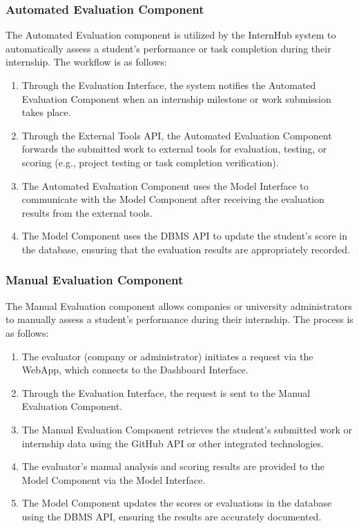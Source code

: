 \subsubsection{Automated Evaluation Component}
The Automated Evaluation component is utilized by the InternHub system to automatically assess a student’s performance or task completion during their internship. The workflow is as follows:
\begin{enumerate}
    \item Through the Evaluation Interface, the system notifies the Automated Evaluation Component when an internship milestone or work submission takes place.
    \item Through the External Tools API, the Automated Evaluation Component forwards the submitted work to external tools for evaluation, testing, or scoring (e.g., project testing or task completion verification).
    \item The Automated Evaluation Component uses the Model Interface to communicate with the Model Component after receiving the evaluation results from the external tools.
    \item The Model Component uses the DBMS API to update the student's score in the database, ensuring that the evaluation results are appropriately recorded.
\end{enumerate}

\subsubsection{Manual Evaluation Component}
The Manual Evaluation component allows companies or university administrators to manually assess a student’s performance during their internship. The process is as follows:
\begin{enumerate}
    \item The evaluator (company or administrator) initiates a request via the WebApp, which connects to the Dashboard Interface.
    \item Through the Evaluation Interface, the request is sent to the Manual Evaluation Component.
    \item The Manual Evaluation Component retrieves the student's submitted work or internship data using the GitHub API or other integrated technologies.
    \item The evaluator's manual analysis and scoring results are provided to the Model Component via the Model Interface.
    \item The Model Component updates the scores or evaluations in the database using the DBMS API, ensuring the results are accurately documented.
\end{enumerate}

